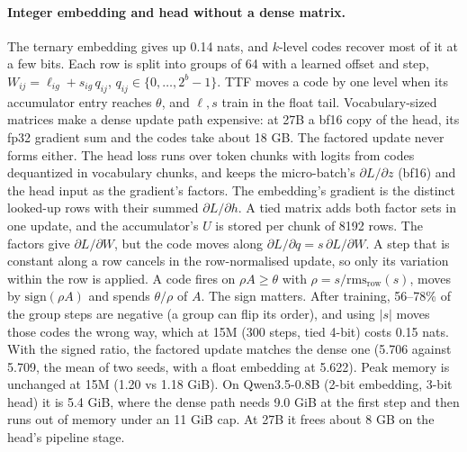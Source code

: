 \documentclass[10pt,twocolumn]{article}
\begin{document}
\paragraph{Integer embedding and head without a dense matrix.} The ternary embedding gives up 0.14 nats, and $k$-level codes
recover most of it at a few bits. Each row is split into groups of 64 with a learned offset and step,
$W_{ij}=\ell_{ig}+s_{ig}\,q_{ij}$, $q_{ij}\in\{0,\dots,2^b-1\}$. TTF moves a code by one level when its accumulator entry
reaches $\theta$, and $\ell,s$ train in the float tail. Vocabulary-sized matrices make a dense update path expensive:
at 27B a bf16 copy of the head, its fp32 gradient sum and the codes take about 18 GB. The factored update never forms
either. The head loss runs over token chunks with logits from codes dequantized in vocabulary chunks, and keeps the
micro-batch's $\partial L/\partial z$ (bf16) and the head input as the gradient's factors. The embedding's gradient is
the distinct looked-up rows with their summed $\partial L/\partial h$. A tied matrix adds both factor sets in one
update, and the accumulator's $U$ is stored per chunk of 8192 rows. The factors give $\partial L/\partial W$, but the
code moves along $\partial L/\partial q=s\,\partial L/\partial W$. A step that is constant along a row cancels in the
row-normalised update, so only its variation within the row is applied. A code fires on $\rho A\ge\theta$ with
$\rho=s/\mathrm{rms}_{\text{row}}(s)$, moves by $\mathrm{sign}(\rho A)$ and spends $\theta/\rho$ of $A$. The sign matters.
After training, 56--78\% of the group steps are negative (a group can flip its order), and using $|s|$ moves those codes
the wrong way, which at 15M (300 steps, tied 4-bit) costs 0.15 nats. With the signed ratio, the factored update matches
the dense one (5.706 against 5.709, the mean of two seeds, with a float embedding at 5.622). Peak memory is unchanged at 15M (1.20 vs
1.18 GiB). On Qwen3.5-0.8B (2-bit embedding, 3-bit head) it is 5.4 GiB, where the dense path needs 9.0 GiB at the
first step and then runs out of memory under an 11 GiB cap. At 27B it frees about 8 GB on the head's pipeline stage.
\end{document}
